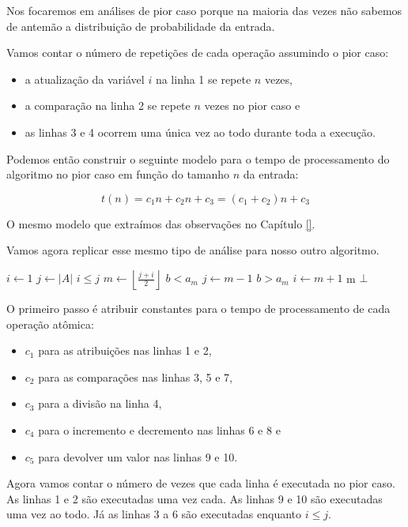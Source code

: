 Nos focaremos em análises de pior caso porque na maioria das vezes não sabemos de antemão a distribuição de probabilidade da entrada.

Vamos contar o número de repetições de cada operação assumindo o pior caso:
\begin{itemize}
\item a atualização da variável $i$ na linha 1 se repete $n$ vezes,
\item a comparação na linha 2 se repete $n$ vezes no pior caso e
\item as linhas 3 e 4 ocorrem uma única vez ao todo durante toda a execução.
\end{itemize}

Podemos então construir o seguinte modelo para o tempo de processamento do algoritmo no pior caso em função do tamanho $n$ da entrada:

\begin{displaymath}
  t(n) = c_1n + c_2n + c_3 = (c_1 + c_2)n + c_3
\end{displaymath}

O mesmo modelo que extraímos das observações no Capítulo \ref{}.

Vamos agora replicar esse mesmo tipo de análise para nosso outro algoritmo.
\begin{codebox}
  \li $i \gets 1$
  \li $j \gets |A|$
  \li \While $i \leq j$
  \li \Do $m \gets \left \lfloor{\frac{j+i}{2}}\right\rfloor$
  \li \If $b < a_m$
  \li     \Then $j \gets m - 1$
  \li \Else
      \If $b > a_m$
  \li      \Then $i \gets m + 1$
  \li \Else \Return m 
      \End
  \End
  \End
  \li \Return $\bot$
\end{codebox}

O primeiro passo é atribuir constantes para o tempo de processamento de cada operação atômica:
\begin{itemize}
\item $c_1$ para as atribuições nas linhas 1 e 2,
\item $c_2$ para as comparações nas linhas 3, 5 e 7,
\item $c_3$ para a divisão na linha 4,
\item $c_4$ para o incremento e decremento nas linhas 6 e 8 e
\item $c_5$ para devolver um valor nas linhas 9 e 10.
\end{itemize}

Agora vamos contar o número de vezes que cada linha é executada no pior caso.
As linhas 1 e 2 são executadas uma vez cada.
As linhas 9 e 10 são executadas uma vez ao todo.
Já as linhas 3 a 6 são executadas enquanto $i \leq j$.

